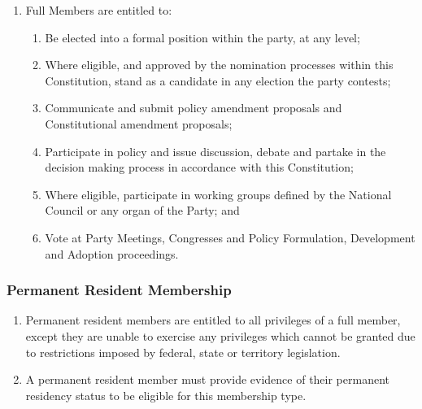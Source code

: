 \documentclass[a4paper,titlepage,8.5pt]{article}
\begin{document}
\begin{enumerate}
\item Full Members are entitled to:
\begin{enumerate}
\item Be elected into a formal position within the party, at any level;
\item Where eligible, and approved by the nomination processes within this Constitution, stand as a candidate in any election the party contests;
\item Communicate and submit policy amendment proposals and Constitutional amendment proposals;
\item Participate in policy and issue discussion, debate and partake in the decision making process in accordance with this Constitution;
\item Where eligible, participate in working groups defined by the National Council or any organ of the Party; and
\item Vote at Party Meetings, Congresses and Policy Formulation, Development and Adoption proceedings.
\end{enumerate}
\end{enumerate}

\subsubsection{Permanent Resident Membership}
\begin{enumerate}
\item Permanent resident members are entitled to all privileges of a full member, except they are unable to exercise any privileges which cannot be granted due to restrictions imposed by federal, state or territory legislation.
\item A permanent resident member must provide evidence of their permanent residency status to be eligible for this membership type.
\end{enumerate}
\end{document}
